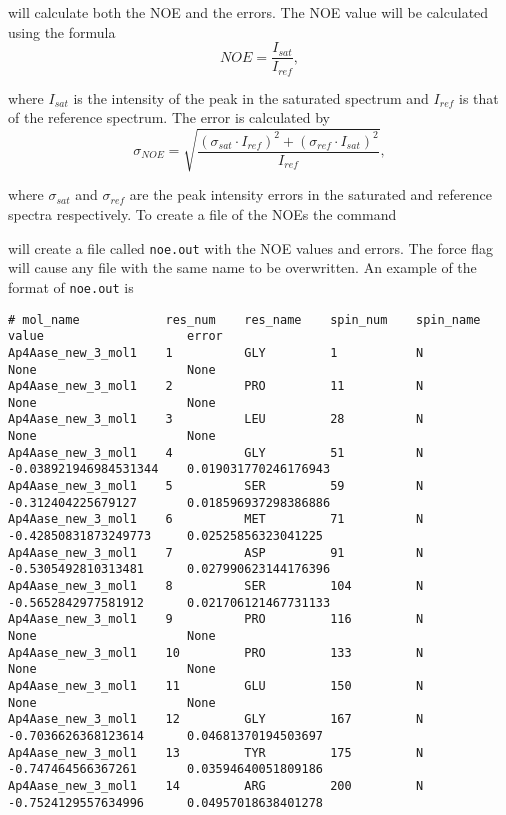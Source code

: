 
will calculate both the NOE and the errors.  The NOE value will be calculated using the formula
\begin{equation}
NOE = \frac{I_{sat}}{I_{ref}},
\end{equation}

\noindent where $I_{sat}$ is the intensity of the peak in the saturated spectrum and $I_{ref}$ is that of the reference spectrum.  The error is calculated by
\begin{equation}
\sigma_{NOE} = \sqrt{\frac{(\sigma_{sat} \cdot I_{ref})^2 + (\sigma_{ref} \cdot I_{sat})^2}{I_{ref}}},
\end{equation}

\noindent where $\sigma_{sat}$ and $\sigma_{ref}$ are the peak intensity errors in the saturated and reference spectra respectively.  To create a file of the NOEs the command


will create a file called \texttt{noe.out} with the NOE values and errors.  The force flag will cause any file with the same name to be overwritten.  An example of the format of \texttt{noe.out} is

{\scriptsize \begin{verbatim}
# mol_name            res_num    res_name    spin_num    spin_name    value                    error                   
Ap4Aase_new_3_mol1    1          GLY         1           N            None                     None                    
Ap4Aase_new_3_mol1    2          PRO         11          N            None                     None                    
Ap4Aase_new_3_mol1    3          LEU         28          N            None                     None                    
Ap4Aase_new_3_mol1    4          GLY         51          N            -0.038921946984531344    0.019031770246176943    
Ap4Aase_new_3_mol1    5          SER         59          N            -0.312404225679127       0.018596937298386886    
Ap4Aase_new_3_mol1    6          MET         71          N            -0.42850831873249773     0.02525856323041225     
Ap4Aase_new_3_mol1    7          ASP         91          N            -0.5305492810313481      0.027990623144176396    
Ap4Aase_new_3_mol1    8          SER         104         N            -0.5652842977581912      0.021706121467731133    
Ap4Aase_new_3_mol1    9          PRO         116         N            None                     None                    
Ap4Aase_new_3_mol1    10         PRO         133         N            None                     None                    
Ap4Aase_new_3_mol1    11         GLU         150         N            None                     None                    
Ap4Aase_new_3_mol1    12         GLY         167         N            -0.7036626368123614      0.04681370194503697     
Ap4Aase_new_3_mol1    13         TYR         175         N            -0.747464566367261       0.03594640051809186     
Ap4Aase_new_3_mol1    14         ARG         200         N            -0.7524129557634996      0.04957018638401278     
\end{verbatim}}



